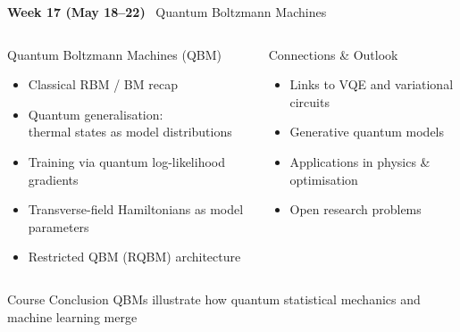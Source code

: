 \documentclass[aspectratio=169,10pt]{beamer}
\newcommand{\week}[1]{\textcolor{blue!60!black}{\textbf{#1}}}
\begin{document}
\begin{frame}{\week{Week 17 (May 18--22)} \ Quantum Boltzmann Machines}
  \begin{columns}[T]
      \begin{block}{Quantum Boltzmann Machines (QBM)}
        \begin{itemize}
          \item Classical RBM / BM recap
          \item Quantum generalisation:\\
                thermal states as model distributions
          \item Training via quantum log-likelihood gradients
          \item Transverse-field Hamiltonians as model parameters
          \item Restricted QBM (RQBM) architecture
        \end{itemize}
      \end{block}
      \begin{block}{Connections \& Outlook}
        \begin{itemize}
          \item Links to VQE and variational circuits
          \item Generative quantum models
          \item Applications in physics \& optimisation
          \item Open research problems
        \end{itemize}
      \end{block}
  \end{columns}
  \vspace{4pt}
  \begin{alertblock}{Course Conclusion}
    QBMs illustrate how quantum statistical mechanics and
    machine learning merge
  \end{alertblock}
\end{frame}
\end{document}
